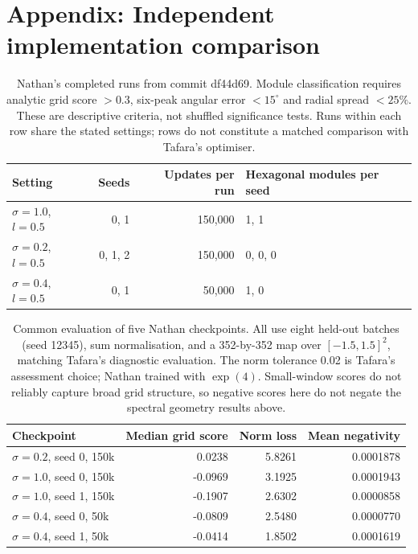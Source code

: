 \documentclass[10pt,letterpaper]{article}
\begin{document}
\section{Appendix: Independent implementation comparison}
\begin{table}[h]
\centering
\caption{Nathan's completed runs from commit df44d69. Module classification requires analytic grid score $>0.3$, six-peak angular error $<15^\circ$ and radial spread $<25\%$. These are descriptive criteria, not shuffled significance tests. Runs within each row share the stated settings; rows do not constitute a matched comparison with Tafara's optimiser.}
\label{tab:joint}
\begin{tabular}{lrrl}
\toprule
Setting & Seeds & Updates per run & Hexagonal modules per seed\\
\midrule
$\sigma=1.0$, $l=0.5$ & 0, 1 & 150,000 & 1, 1\\
$\sigma=0.2$, $l=0.5$ & 0, 1, 2 & 150,000 & 0, 0, 0\\
$\sigma=0.4$, $l=0.5$ & 0, 1 & 50,000 & 1, 0\\
\bottomrule
\end{tabular}
\end{table}
\begin{table}[h]
\centering
\caption{Common evaluation of five Nathan checkpoints. All use eight held-out batches (seed 12345), sum normalisation, and a 352-by-352 map over $[-1.5,1.5]^2$, matching Tafara's diagnostic evaluation. The norm tolerance 0.02 is Tafara's assessment choice; Nathan trained with $\exp(4)$. Small-window scores do not reliably capture broad grid structure, so negative scores here do not negate the spectral geometry results above.}
\begin{tabular}{lrrr}
\toprule
Checkpoint & Median grid score & Norm loss & Mean negativity\\
\midrule
$\sigma=0.2$, seed 0, 150k & 0.0238 & 5.8261 & 0.0001878\\
$\sigma=1.0$, seed 0, 150k & -0.0969 & 3.1925 & 0.0001943\\
$\sigma=1.0$, seed 1, 150k & -0.1907 & 2.6302 & 0.0000858\\
$\sigma=0.4$, seed 0, 50k & -0.0809 & 2.5480 & 0.0000770\\
$\sigma=0.4$, seed 1, 50k & -0.0414 & 1.8502 & 0.0001619\\
\bottomrule
\end{tabular}
\end{table}
\clearpage


\end{document}
